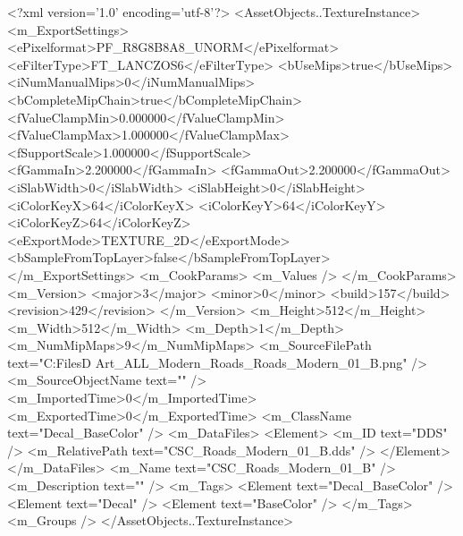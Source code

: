 <?xml version='1.0' encoding='utf-8'?>
<AssetObjects..TextureInstance>
  <m_ExportSettings>
    <ePixelformat>PF_R8G8B8A8_UNORM</ePixelformat>
    <eFilterType>FT_LANCZOS6</eFilterType>
    <bUseMips>true</bUseMips>
    <iNumManualMips>0</iNumManualMips>
    <bCompleteMipChain>true</bCompleteMipChain>
    <fValueClampMin>0.000000</fValueClampMin>
    <fValueClampMax>1.000000</fValueClampMax>
    <fSupportScale>1.000000</fSupportScale>
    <fGammaIn>2.200000</fGammaIn>
    <fGammaOut>2.200000</fGammaOut>
    <iSlabWidth>0</iSlabWidth>
    <iSlabHeight>0</iSlabHeight>
    <iColorKeyX>64</iColorKeyX>
    <iColorKeyY>64</iColorKeyY>
    <iColorKeyZ>64</iColorKeyZ>
    <eExportMode>TEXTURE_2D</eExportMode>
    <bSampleFromTopLayer>false</bSampleFromTopLayer>
  </m_ExportSettings>
  <m_CookParams>
    <m_Values />
  </m_CookParams>
  <m_Version>
    <major>3</major>
    <minor>0</minor>
    <build>157</build>
    <revision>429</revision>
  </m_Version>
  <m_Height>512</m_Height>
  <m_Width>512</m_Width>
  <m_Depth>1</m_Depth>
  <m_NumMipMaps>9</m_NumMipMaps>
  <m_SourceFilePath text="C:\Users\Shadow\Desktop\Working Files\3D Art\Decals\CSC_ALL_Modern_Roads\textures\CSC_Roads_Modern_01_B.png" />
  <m_SourceObjectName text="" />
  <m_ImportedTime>0</m_ImportedTime>
  <m_ExportedTime>0</m_ExportedTime>
  <m_ClassName text="Decal_BaseColor" />
  <m_DataFiles>
    <Element>
      <m_ID text="DDS" />
      <m_RelativePath text="CSC_Roads_Modern_01_B.dds" />
    </Element>
  </m_DataFiles>
  <m_Name text="CSC_Roads_Modern_01_B" />
  <m_Description text="" />
  <m_Tags>
    <Element text="Decal_BaseColor" />
    <Element text="Decal" />
    <Element text="BaseColor" />
  </m_Tags>
  <m_Groups />
</AssetObjects..TextureInstance>